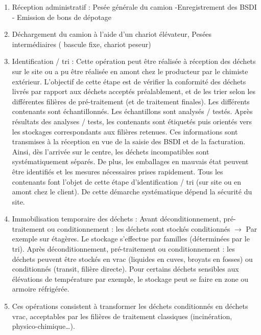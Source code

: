 \begin{enumerate}
    \item Réception administratif : Pesée générale du camion -Enregistrement des BSDI - Emission de bons de dépotage 
    \item Déchargement du camion à l’aide d’un chariot élévateur, Pesées intermédiaires ( bascule fixe, chariot peseur)
    \item Identification / tri : Cette opération peut être réalisée à réception des déchets sur le site ou a pu être réalisée en amont chez le producteur par le chimiste extérieur. L’objectif de cette étape est de vérifier la conformité des déchets livrés par rapport aux déchets acceptés préalablement, et de les trier selon les différentes filières de pré-traitement (et de traitement finales). Les différents contenants sont échantillonnés. Les échantillons sont analysés / testés. Après résultats des analyses / tests, les contenants sont étiquetés puis orientés vers les stockages correspondants aux filières retenues. Ces informations sont transmises à la réception en vue de la saisie des BSDI et de la facturation.
Ainsi, dès l’arrivée sur le centre, les déchets incompatibles sont systématiquement séparés. De plus, les emballages en mauvais état peuvent être identifiés et les mesures nécessaires prises rapidement. Tous les contenants font l’objet de cette étape d’identification / tri (sur site ou en amont chez le client). De cette démarche systématique dépend la sécurité du site.

    \item Immobilisation temporaire  des déchets : Avant déconditionnement, pré-traitement ou conditionnement : les déchets sont stockés conditionnés $ \rightarrow $ Par exemple sur étagères. Le stockage s’effectue par familles (déterminées par le tri). Après déconditionnement, pré-traitement ou conditionnement : les déchets peuvent être stockés en vrac (liquides en cuves, broyats en fosses) ou conditionnés (transit, filière directe). Pour certains déchets sensibles aux élévations de température par exemple, le stockage peut se faire en zone ou armoire réfrigérée.

    \item Ces opérations consistent à transformer les déchets conditionnés en déchets vrac, acceptables par les filières de traitement classiques (incinération, physico-chimique…).
\end{enumerate}

\vspace{0.3 cm}

